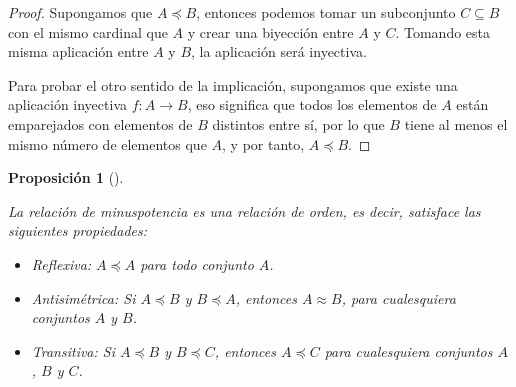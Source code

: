 \documentclass[
  a4paper,
]{scrreport}
\providecommand{\tightlist}{%
  \setlength{\itemsep}{0pt}\setlength{\parskip}{0pt}}\usepackage{longtable,booktabs,array}
\theoremstyle{plain}
\theoremstyle{plain}
\theoremstyle{definition}
\theoremstyle{definition}
\theoremstyle{plain}
\newtheorem{proposition}{Proposición}[chapter]
\theoremstyle{definition}
\theoremstyle{remark}
\begin{document}
\begin{tcolorbox}[enhanced jigsaw, rightrule=.15mm, toptitle=1mm, colbacktitle=quarto-callout-note-color!10!white, bottomrule=.15mm, opacityback=0, arc=.35mm, breakable, toprule=.15mm, left=2mm, coltitle=black, colback=white, opacitybacktitle=0.6, titlerule=0mm, colframe=quarto-callout-note-color-frame, bottomtitle=1mm, title=\textcolor{quarto-callout-note-color}{\faInfo}\hspace{0.5em}{Demostración}, leftrule=.75mm]

\begin{proof}

Supongamos que \(A\preceq B\), entonces podemos tomar un subconjunto
\(C\subseteq B\) con el mismo cardinal que \(A\) y crear una biyección
entre \(A\) y \(C\). Tomando esta misma aplicación entre \(A\) y \(B\),
la aplicación será inyectiva.

Para probar el otro sentido de la implicación, supongamos que existe una
aplicación inyectiva \(f:A\longrightarrow B\), eso significa que todos
los elementos de \(A\) están emparejados con elementos de \(B\)
distintos entre sí, por lo que \(B\) tiene al menos el mismo número de
elementos que \(A\), y por tanto, \(A\preceq B\).

\end{proof}

\end{tcolorbox}

\begin{proposition}[]\protect\hypertarget{prp-minuspotencia-relacion-orden}{}\label{prp-minuspotencia-relacion-orden}

La relación de minuspotencia es una relación de orden, es decir,
satisface las siguientes propiedades:

\begin{itemize}
\tightlist
\item
  Reflexiva: \(A\preceq A\) para todo conjunto \(A\).
\item
  Antisimétrica: Si \(A\preceq B\) y \(B\preceq A\), entonces
  \(A\approx B\), para cualesquiera conjuntos \(A\) y \(B\).
\item
  Transitiva: Si \(A\preceq B\) y \(B\preceq C\), entonces
  \(A\preceq C\) para cualesquiera conjuntos \(A\), \(B\) y \(C\).
\end{itemize}

\end{proposition}
\end{document}
